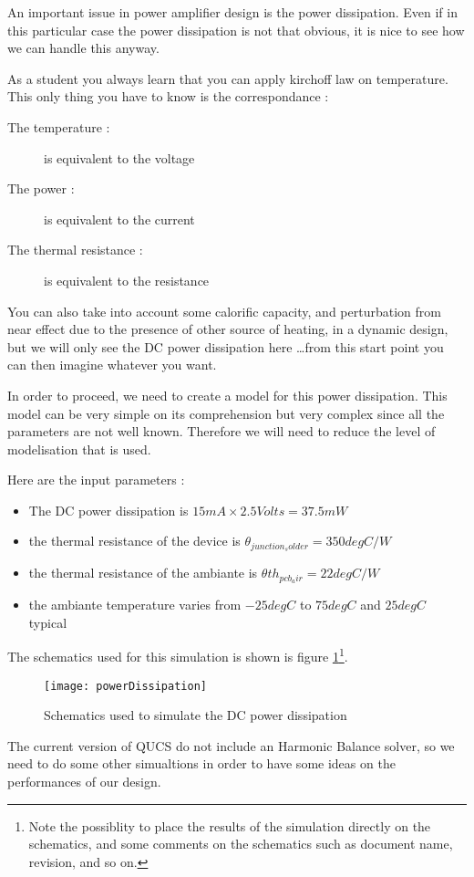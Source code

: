 
An important issue in power amplifier design is the power dissipation. Even if in this particular case the power dissipation is not that obvious, it is nice to see how we can handle this anyway.

\bigskip

As a student you always learn that you can apply kirchoff law on temperature. This only thing you have to know is the correspondance : 

\begin{description}
\item[The temperature : ] is equivalent to the voltage
\item[The power : ] is equivalent to the current 
\item[The thermal resistance : ] is equivalent to the resistance
\end{description}

You can also take into account some calorific capacity, and perturbation from near effect due to the presence of other source of heating, in a dynamic design, but we will only see the DC power dissipation here \ldots from this start point you can then imagine whatever you want.

\bigskip

In order to proceed, we need to create a model for this power dissipation. This model can be very simple on its comprehension but very complex since all the parameters are not well known. Therefore we will need to reduce the level of modelisation that is used.

Here are the input parameters :
\begin{itemize}
\item The DC power dissipation is $15 mA \times 2.5 Volts = 37.5 mW $
\item the thermal resistance of the device is $\theta_{junction_solder}=350 degC/W$
\item the thermal resistance of the ambiante is $\theta th_{pcb_air}=22 degC/W$
\item the ambiante temperature varies from $-25 degC$ to $75 degC$ and $25 degC$ typical
\end{itemize}


The schematics used for this simulation is shown is figure \ref{design:pa:bias:DCpower}\footnote{Note the possiblity to place the results of the simulation directly on the schematics, and some comments on the schematics such as document name, revision, and so on.}.

\begin{figure}[htbp]
\begin{center}
	\texttt{[image: powerDissipation]}
	\caption{Schematics used to simulate the DC power dissipation}
	\label{design:pa:bias:DCpower}
\end{center}
\end{figure}



The current version of QUCS do not include an Harmonic Balance solver, so we need to do some other simualtions in order to have some ideas on the performances of our design.
